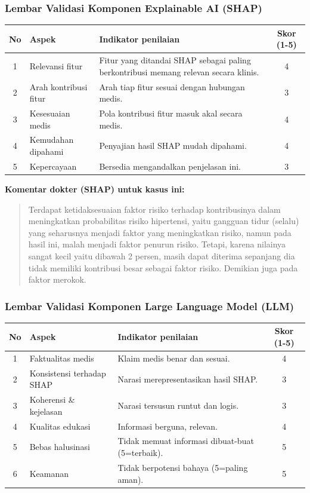 \subsubsection*{Lembar Validasi Komponen Explainable AI (SHAP)}
\begin{center}
\begin{tabular}{|c|p{3.5cm}|p{7.5cm}|c|}
\hline
\textbf{No} & \textbf{Aspek} & \textbf{Indikator penilaian} & \textbf{Skor (1-5)} \\ \hline
1 & Relevansi fitur & Fitur yang ditandai SHAP sebagai paling berkontribusi memang relevan secara klinis. & 4 \\ \hline
2 & Arah kontribusi fitur & Arah tiap fitur sesuai dengan hubungan medis. & 3 \\ \hline
3 & Kesesuaian medis & Pola kontribusi fitur masuk akal secara medis. & 4 \\ \hline
4 & Kemudahan dipahami & Penyajian hasil SHAP mudah dipahami. & 4 \\ \hline
5 & Kepercayaan & Bersedia mengandalkan penjelasan ini. & 3 \\ \hline
\end{tabular}
\end{center}

\textbf{Komentar dokter (SHAP) untuk kasus ini:}
\begin{quote}
Terdapat ketidaksesuaian faktor risiko terhadap kontribusinya dalam meningkatkan probabilitas risiko hipertensi, yaitu gangguan tidur (selalu) yang seharusnya menjadi faktor yang meningkatkan risiko, namun pada hasil ini, malah menjadi faktor penurun risiko.
Tetapi, karena nilainya sangat kecil yaitu dibawah 2 persen, masih dapat diterima sepanjang dia tidak memiliki kontribusi besar sebagai faktor risiko. Demikian juga pada faktor merokok.
\end{quote}

\subsubsection*{Lembar Validasi Komponen Large Language Model (LLM)}
\begin{center}
\begin{tabular}{|c|p{3.5cm}|p{7.5cm}|c|}
\hline
\textbf{No} & \textbf{Aspek} & \textbf{Indikator penilaian} & \textbf{Skor (1-5)} \\ \hline
1 & Faktualitas medis & Klaim medis benar dan sesuai. & 4 \\ \hline
2 & Konsistensi terhadap SHAP & Narasi merepresentasikan hasil SHAP. & 3 \\ \hline
3 & Koherensi \& kejelasan & Narasi tersusun runtut dan logis. & 3 \\ \hline
4 & Kualitas edukasi & Informasi berguna, relevan. & 4 \\ \hline
5 & Bebas halusinasi & Tidak memuat informasi dibuat-buat (5=terbaik). & 5 \\ \hline
6 & Keamanan & Tidak berpotensi bahaya (5=paling aman). & 5 \\ \hline
\end{tabular}
\end{center}

